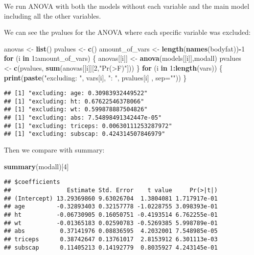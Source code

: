 \documentclass[]{article}
\newenvironment{Shaded}{\begin{snugshade}}{\end{snugshade}}
\newcommand{\ControlFlowTok}[1]{\textcolor[rgb]{0.13,0.29,0.53}{\textbf{#1}}}
\newcommand{\DataTypeTok}[1]{\textcolor[rgb]{0.13,0.29,0.53}{#1}}
\newcommand{\DecValTok}[1]{\textcolor[rgb]{0.00,0.00,0.81}{#1}}
\newcommand{\KeywordTok}[1]{\textcolor[rgb]{0.13,0.29,0.53}{\textbf{#1}}}
\newcommand{\NormalTok}[1]{#1}
\newcommand{\OperatorTok}[1]{\textcolor[rgb]{0.81,0.36,0.00}{\textbf{#1}}}
\newcommand{\StringTok}[1]{\textcolor[rgb]{0.31,0.60,0.02}{#1}}
\begin{document}
We run ANOVA with both the models without each variable and the main
model including all the other variables.

We can see the pvalues for the ANOVA where each specific variable was
excluded:

\begin{Shaded}
\begin{Highlighting}[]
\NormalTok{anovas <-}\StringTok{ }\KeywordTok{list}\NormalTok{()}
\NormalTok{pvalues <-}\StringTok{ }\KeywordTok{c}\NormalTok{()}
\NormalTok{amount_of_vars <-}\StringTok{ }\KeywordTok{length}\NormalTok{(}\KeywordTok{names}\NormalTok{(bodyfat))}\OperatorTok{-}\DecValTok{1}
\ControlFlowTok{for}\NormalTok{ (i }\ControlFlowTok{in} \DecValTok{1}\OperatorTok{:}\NormalTok{amount_of_vars) \{}
\NormalTok{    anovas[[i]] <-}\StringTok{ }\KeywordTok{anova}\NormalTok{(models[[i]],modall)}
\NormalTok{    pvalues <-}\StringTok{ }\KeywordTok{c}\NormalTok{(pvalues, }\KeywordTok{sum}\NormalTok{(anovas[[i]][}\DecValTok{2}\NormalTok{,}\StringTok{"Pr(>F)"}\NormalTok{]))}
\NormalTok{\}}
\ControlFlowTok{for}\NormalTok{ (i }\ControlFlowTok{in} \DecValTok{1}\OperatorTok{:}\KeywordTok{length}\NormalTok{(vars)) \{}
    \KeywordTok{print}\NormalTok{(}\KeywordTok{paste}\NormalTok{(}\StringTok{"excluding: "}\NormalTok{, vars[i], }\StringTok{": "}\NormalTok{, pvalues[i] , }\DataTypeTok{sep=}\StringTok{""}\NormalTok{))}
\NormalTok{\}}
\end{Highlighting}
\end{Shaded}

\begin{verbatim}
## [1] "excluding: age: 0.30983932449522"
## [1] "excluding: ht: 0.67622546378066"
## [1] "excluding: wt: 0.599878887504826"
## [1] "excluding: abs: 7.54898491342447e-05"
## [1] "excluding: triceps: 0.00630111253287972"
## [1] "excluding: subscap: 0.424314507846979"
\end{verbatim}

Then we compare with summary:

\begin{Shaded}
\begin{Highlighting}[]
\KeywordTok{summary}\NormalTok{(modall)[}\DecValTok{4}\NormalTok{]}
\end{Highlighting}
\end{Shaded}

\begin{verbatim}
## $coefficients
##                Estimate Std. Error    t value     Pr(>|t|)
## (Intercept) 13.29369860 9.63026704  1.3804081 1.717917e-01
## age         -0.32893403 0.32157778 -1.0228755 3.098393e-01
## ht          -0.06730905 0.16050751 -0.4193514 6.762255e-01
## wt          -0.01365183 0.02590783 -0.5269385 5.998789e-01
## abs          0.37141976 0.08836595  4.2032001 7.548985e-05
## triceps      0.38742647 0.13761017  2.8153912 6.301113e-03
## subscap      0.11405213 0.14192779  0.8035927 4.243145e-01
\end{verbatim}
\end{document}
